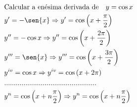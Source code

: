 \begin{ex}
\begin{align}
&\text{Calcular a enésima derivada de}\quad y=\cos{x}\nonumber\\
&y'=-\sen{x} \Rightarrow y'=\cos{\left(x+\frac{\pi}{2}\right)}\nonumber\\
&y''=-\cos{x} \Rightarrow y''=\cos{\left(x+\frac{2\pi}{2}\right)}\nonumber\\
&y'''=\sen{x} \Rightarrow y'''=\cos{\left(x+\frac{3\pi}{2}\right)}\nonumber\\
&y^{iv}=\cos{x} \Rightarrow y^{iv}=\cos{(x+2\pi)}\nonumber\\
&................................................\nonumber\\
&y^{n}=\cos{\left(x+n\frac{\pi}{2}\right)} \Rightarrow y^{n}=\cos{\left(x+n\frac{\pi}{2}\right)}\nonumber
\end{align}
\end{ex}